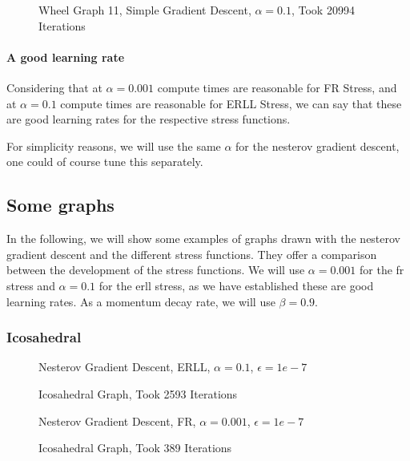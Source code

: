 \documentclass[12pt]{article}
\begin{document}
\begin{figure}[H]
\centering

\caption{\label{wheel-graph-erll} Wheel Graph 11, Simple Gradient Descent, $\alpha=0.1$, Took 20994 Iterations}
\end{figure}

\paragraph{A good learning rate}

Considering that at $\alpha=0.001$ compute times are reasonable for FR Stress,
and at $\alpha=0.1$ compute times are reasonable for ERLL Stress, we can say that these are good learning rates for the respective stress functions.

For simplicity reasons, we will use the same $\alpha$ for the nesterov gradient descent,
one could of course tune this separately.

\subsection{Some graphs}
In the following, we will show some examples of graphs drawn with
the nesterov gradient descent and the different stress functions.
They offer a comparison between the development of the stress functions.
We will use $\alpha=0.001$ for the fr stress and $\alpha=0.1$ for the erll stress,
as we have established these are good learning rates.
As a momentum decay rate, we will use $\beta=0.9$.

\subsubsection{Icosahedral}

\begin{figure}[H]
\centering
Nesterov Gradient Descent, ERLL, $\alpha=0.1$, $\epsilon=1e-7$

\caption{\label{icosahedral-nesterov-erll} Icosahedral Graph, Took 2593 Iterations}
\end{figure}

\begin{figure}[H]
\centering
Nesterov Gradient Descent, FR, $\alpha=0.001$, $\epsilon=1e-7$

\caption{\label{icosahedral-nesterov-fr} Icosahedral Graph, Took 389 Iterations}
\end{figure}
\end{document}
